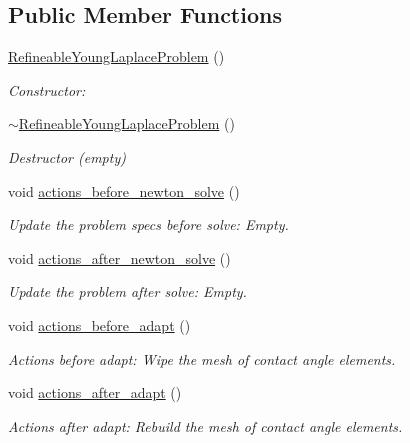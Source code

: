 \subsection*{Public Member Functions}
\begin{DoxyCompactItemize}
\item 
\hyperlink{classRefineableYoungLaplaceProblem_a78f77a299f2770a82378fcccf86a0b71}{Refineable\+Young\+Laplace\+Problem} ()
\begin{DoxyCompactList}\small\item\em Constructor\+: \end{DoxyCompactList}\item 
\hyperlink{classRefineableYoungLaplaceProblem_a24b45d5ecdd1d7dbb678e7f74777bf41}{$\sim$\+Refineable\+Young\+Laplace\+Problem} ()
\begin{DoxyCompactList}\small\item\em Destructor (empty) \end{DoxyCompactList}\item 
void \hyperlink{classRefineableYoungLaplaceProblem_a2807bb8cddbfa553df9f5dd170c8645d}{actions\+\_\+before\+\_\+newton\+\_\+solve} ()
\begin{DoxyCompactList}\small\item\em Update the problem specs before solve\+: Empty. \end{DoxyCompactList}\item 
void \hyperlink{classRefineableYoungLaplaceProblem_a0791c90a16016372e09faf3f5721ecbe}{actions\+\_\+after\+\_\+newton\+\_\+solve} ()
\begin{DoxyCompactList}\small\item\em Update the problem after solve\+: Empty. \end{DoxyCompactList}\item 
void \hyperlink{classRefineableYoungLaplaceProblem_ab64eb0b58beb3bb096ecc81b1a3f8a4f}{actions\+\_\+before\+\_\+adapt} ()
\begin{DoxyCompactList}\small\item\em Actions before adapt\+: Wipe the mesh of contact angle elements. \end{DoxyCompactList}\item 
void \hyperlink{classRefineableYoungLaplaceProblem_aa2eab8da1b83091df804ede7c60fac87}{actions\+\_\+after\+\_\+adapt} ()
\begin{DoxyCompactList}\small\item\em Actions after adapt\+: Rebuild the mesh of contact angle elements. \end{DoxyCompactList}\item 

\end{DoxyCompactItemize}
